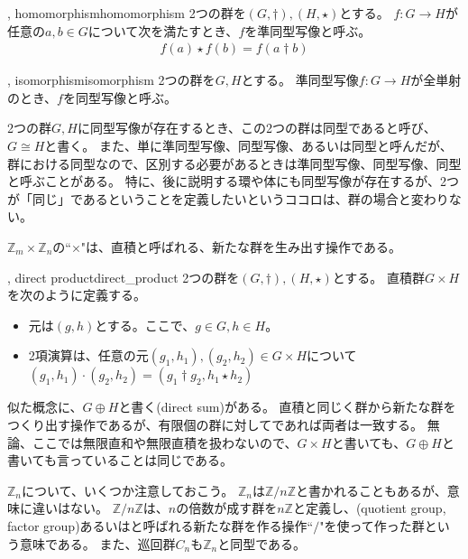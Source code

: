 \begin{Defi}{, homomorphism}{homomorphism}
2つの群を$(G, \dagger),(H, \star)$とする。
$f:G\to H$が任意の$a,b\in G$について次を満たすとき、$f$を準同型写像と呼ぶ。
\begin{align*}
f(a) \star f(b) = f(a \dagger b)
\end{align*}
\end{Defi}

\begin{Defi}{, isomorphism}{isomorphism}
2つの群を$G,H$とする。
準同型写像$f:G\to H$が全単射のとき、$f$を同型写像と呼ぶ。
\end{Defi}

2つの群$G,H$に同型写像が存在するとき、この2つの群は同型であると呼び、$G\cong H$と書く。
また、単に準同型写像、同型写像、あるいは同型と呼んだが、群における同型なので、区別する必要があるときは準同型写像、同型写像、同型と呼ぶことがある。
特に、後に説明する環や体にも同型写像が存在するが、2つが「同じ」であるということを定義したいというココロは、群の場合と変わりない。

$\mathbb{Z}_m \times \mathbb{Z}_n$の``$\times$"は、直積と呼ばれる、新たな群を生み出す操作である。

\begin{Defi}{, direct product}{direct_product}
2つの群を$(G, \dagger),(H, \star)$とする。
直積群$G \times H$を次のように定義する。
\begin{itemize}
 \item 元は$(g, h)$とする。ここで、$g \in G, h \in H$。
 \item 2項演算は、任意の元$(g_1, h_1), (g_2, h_2)\in G \times H$について$(g_1, h_1)\cdot(g_2, h_2) = (g_1 \dagger g_2, h_1 \star h_2)$
\end{itemize}
\end{Defi}

似た概念に、$G \oplus H$と書く(direct sum)がある。
直積と同じく群から新たな群をつくり出す操作であるが、有限個の群に対してであれば両者は一致する。
無論、ここでは無限直和や無限直積を扱わないので、$G \times H$と書いても、$G \oplus H$と書いても言っていることは同じである。

$\mathbb{Z}_n$について、いくつか注意しておこう。
$\mathbb{Z}_n$は$\mathbb{Z}/n\mathbb{Z}$と書かれることもあるが、意味に違いはない。
$\mathbb{Z}/n\mathbb{Z}$は、$n$の倍数が成す群を$n\mathbb{Z}$と定義し、(quotient group, factor group)あるいはと呼ばれる新たな群を作る操作``$/$"を使って作った群という意味である。
また、巡回群$C_n$も$\mathbb{Z}_n$と同型である。

